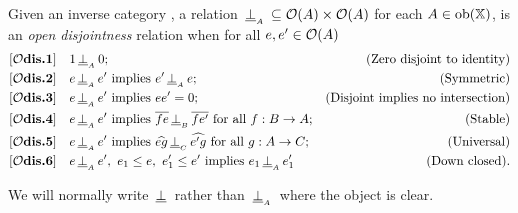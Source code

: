 \begin{definition}\label{def:disjointness_in_open_x}
  Given an inverse category \X, a relation $\,\underline{\perp}_{{}_{A}}\, \subseteq \mathcal{O}({A})\times\mathcal{O}({A})$ for
  each $A \in \mathrm{ob}(\mathbb{X})$, is an \emph{open disjointness} relation when for all $e, e' \in
  \mathcal{O}({A})$
  \begin{align*}
    \axiom{$\mathcal{O}$dis}{1}\quad &1 \ocdperpsub{A} 0; &\text{(Zero disjoint to identity)}\\
    \axiom{$\mathcal{O}$dis}{2}\quad &e \ocdperpsub{A} e' \text{ implies }e' \ocdperpsub{A} e;
    &\text{(Symmetric)}\\
    \axiom{$\mathcal{O}$dis}{3}\quad &e \ocdperpsub{A} e' \text{ implies }e e' = 0; &\text{(Disjoint implies no intersection)}\\
    \axiom{$\mathcal{O}$dis}{4}\quad &e \ocdperpsub{A} e' \text{ implies }\rst{f e} \ocdperpsub{B}
      \rst{f e'}\text{ for all }f:B \to A; &\text{(Stable)}\\
    \axiom{$\mathcal{O}$dis}{5}\quad &e \ocdperpsub{A} e' \text{ implies }\wrg{e g} \ocdperpsub{C}
      \wrg{e' g}\text{ for all }g:A \to C; &\text{(Universal)}\\
    \axiom{$\mathcal{O}$dis}{6}\quad &e \ocdperpsub{A} e',\ e_1 \le e,\ e_1' \le e'
      \text{ implies }e_1 \ocdperpsub{A} e_1' &\text{(Down closed)}.
  \end{align*}
\end{definition}

We will normally write $\,\underline{\perp}\,$ rather than $\,\underline{\perp}_{{}_{A}}\,$ where the object is clear.

